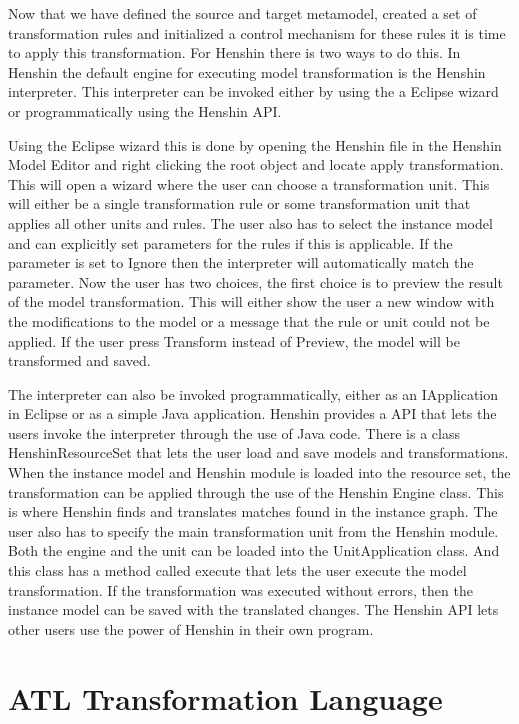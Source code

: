 \documentclass[pdftex,11pt,a4paper]{article}
\begin{document}
Now that we have defined the source and target metamodel, created a set of
transformation rules and initialized a control mechanism for these rules it is
time to apply this transformation. For Henshin there is two ways to do this. In
Henshin the default engine for executing model transformation is the Henshin
interpreter. This interpreter can be invoked either by using the a Eclipse wizard
or programmatically using the Henshin API. 

Using the Eclipse wizard this is done by opening the Henshin file in the Henshin
Model Editor and right clicking the root object and locate apply transformation.
This will open a wizard where the user can choose a transformation unit. This
will either be a single transformation rule or some transformation unit that
applies all other units and rules. The user also has to select the instance
model and can explicitly set parameters for the rules if this is applicable. If
the parameter is set to Ignore then the interpreter will automatically match the
parameter. Now the user has two choices, the first choice is to preview the
result of the model transformation. This will either show the user a new window
with the modifications to the model or a message that the rule or unit could not
be applied. If the user press Transform instead of Preview, the model will be
transformed and saved.

The interpreter can also be invoked programmatically, either as an IApplication
in Eclipse or as a simple Java application. Henshin provides a API that lets the
users invoke the interpreter through the use of Java code. There is a class
HenshinResourceSet that lets the user load and save models and transformations.
When the instance model and Henshin module is loaded into the resource set, the
transformation can be applied through the use of the Henshin Engine class. This
is where Henshin finds and translates matches found in the instance graph. The
user also has to specify the main transformation unit from the Henshin module.
Both the engine and the unit can be loaded into the UnitApplication class. And
this class has a method called execute that lets the user execute the model
transformation. If the transformation was executed without errors, then the
instance model can be saved with the translated changes. The Henshin API lets
other users use the power of Henshin in their own program.

\section{ATL Transformation Language}
\end{document}
